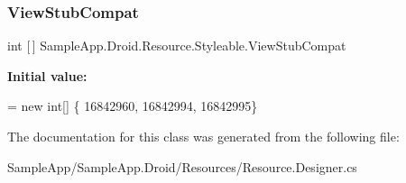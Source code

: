\subsubsection{\texorpdfstring{View\+Stub\+Compat}{ViewStubCompat}}
{\footnotesize\ttfamily int \mbox{[}$\,$\mbox{]} Sample\+App.\+Droid.\+Resource.\+Styleable.\+View\+Stub\+Compat\hspace{0.3cm}{\ttfamily [static]}}

{\bfseries Initial value\+:}
\begin{DoxyCode}
= \textcolor{keyword}{new} \textcolor{keywordtype}{int}[] \{
                    16842960,
                    16842994,
                    16842995\}
\end{DoxyCode}


The documentation for this class was generated from the following file\+:\begin{DoxyCompactItemize}
\item 
Sample\+App/\+Sample\+App.\+Droid/\+Resources/Resource.\+Designer.\+cs\end{DoxyCompactItemize}
